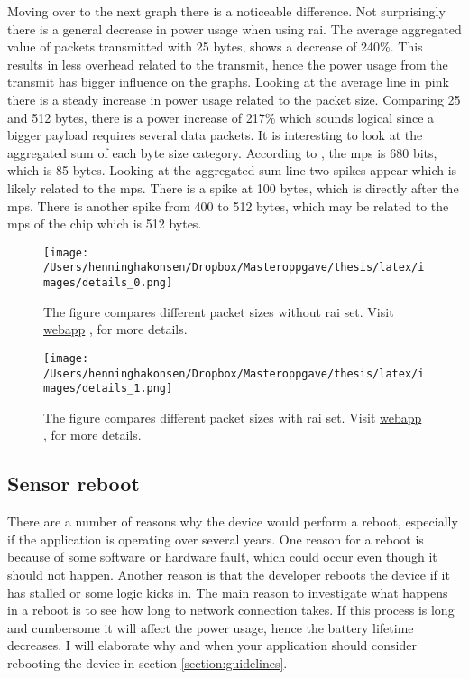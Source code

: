 \documentclass[USenglish]{ifimaster}  %
\begin{document}
Moving over to the next graph there is a noticeable difference. Not surprisingly there is a general decrease in power usage when using \acrshort{rai}. The average aggregated value of packets transmitted with 25 bytes, shows a decrease of 240\%. This results in less overhead related to the transmit, hence the power usage from the transmit has bigger influence on the graphs. Looking at the average line in pink there is a steady increase in power usage related to the packet size. Comparing 25 and 512 bytes, there is a power increase of 217\% which sounds logical since a bigger payload requires several data packets. It is interesting to look at the aggregated sum of each byte size category. According to \cite{online:rohde}, the \acrfull{mps} is 680 bits, which is 85 bytes. Looking at the aggregated sum line two spikes appear which is likely related to the \acrshort{mps}. There is a spike at 100 bytes, which is directly after the \acrshort{mps}. There is another spike from 400 to 512 bytes, which may be related to the \acrshort{mps} of the chip which is 512 bytes.

\begin{figure}[H]
  \centering
  \texttt{[image: /Users/henninghakonsen/Dropbox/Masteroppgave/thesis/latex/images/details\_0.png]}
  \caption[Short-term test - packet size comparison without \acrshort{rai}]{The figure compares different packet sizes without \acrshort{rai} set. Visit \href{http://158.39.77.97:9000/\#/results/UiO\_TELIA\_long\_term\_2018-03-22\_0x0\_30\_20}{webapp} \cite{online:result7}, for more details.}
  \label{figure:details_0}
\end{figure}

\begin{figure}[H]
  \centering
  \texttt{[image: /Users/henninghakonsen/Dropbox/Masteroppgave/thesis/latex/images/details\_1.png]}
  \caption[Short-term test - packet size comparison with \acrshort{rai}]{The figure compares different packet sizes with \acrshort{rai} set. Visit \href{http://158.39.77.97:9000/\#/results/UiO\_TELIA\_long\_term\_2018-03-22\_0x2\_30\_20}{webapp} \cite{online:result8}, for more details.}
  \label{figure:details_1}
\end{figure}

\subsection{Sensor reboot} \label{ssection:reboottest}
There are a number of reasons why the device would perform a reboot, especially if the application is operating over several years. One reason for a reboot is because of some software or hardware fault, which could occur even though it should not happen. Another reason is that the developer reboots the device if it has stalled or some logic kicks in. The main reason to investigate what happens in a reboot is to see how long to network connection takes. If this process is long and cumbersome it will affect the power usage, hence the battery lifetime decreases. I will elaborate why and when your application should consider rebooting the device in section \vref{section:guidelines}.
\end{document}
